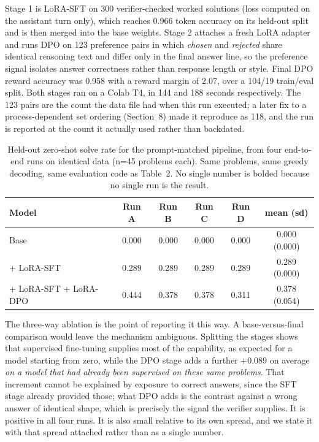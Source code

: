 \documentclass[11pt]{article}
\begin{document}
Stage 1 is LoRA-SFT on 300 verifier-checked worked solutions (loss computed
on the assistant turn only), which reaches 0.966 token accuracy on its
held-out split and is then merged into the base weights. Stage 2 attaches a
fresh LoRA adapter and runs DPO on 123 preference pairs in which
\emph{chosen} and \emph{rejected} share identical reasoning text and differ
only in the final answer line, so the preference signal isolates answer
correctness rather than response length or style. Final DPO reward accuracy
was 0.958 with a reward margin of 2.07, over a 104/19 train/eval split.
Both stages ran on a Colab T4, in 144 and 188 seconds respectively. The 123
pairs are the count the data file had when this run executed; a later fix to
a process-dependent set ordering (Section~8) made it reproduce as 118, and
the run is reported at the count it actually used rather than backdated.

\begin{table}[h]
\centering
\begin{tabular}{lccccc}
\toprule
Model & Run A & Run B & Run C & Run D & mean (sd) \\
\midrule
Base & 0.000 & 0.000 & 0.000 & 0.000 & 0.000 (0.000) \\
+ LoRA-SFT & 0.289 & 0.289 & 0.289 & 0.289 & 0.289 (0.000) \\
+ LoRA-SFT + LoRA-DPO & 0.444 & 0.378 & 0.378 & 0.311 & 0.378 (0.054) \\
\bottomrule
\end{tabular}
\caption{Held-out zero-shot solve rate for the prompt-matched pipeline, from four end-to-end runs on identical data (n=45 problems each). Same problems, same greedy decoding, same evaluation code as Table~2. No single number is bolded because no single run is the result.}
\end{table}

The three-way ablation is the point of reporting it this way. A
base-versus-final comparison would leave the mechanism ambiguous. Splitting
the stages shows that supervised fine-tuning supplies most of the
capability, as expected for a model starting from zero, while the DPO stage
adds a further $+0.089$ on average \emph{on a model that had already been
supervised on these same problems}. That increment cannot be explained by
exposure to correct answers, since the SFT stage already provided those;
what DPO adds is the contrast against a wrong answer of identical shape,
which is precisely the signal the verifier supplies. It is positive in all
four runs. It is also small relative to its own spread, and we state it with
that spread attached rather than as a single number.
\end{document}
